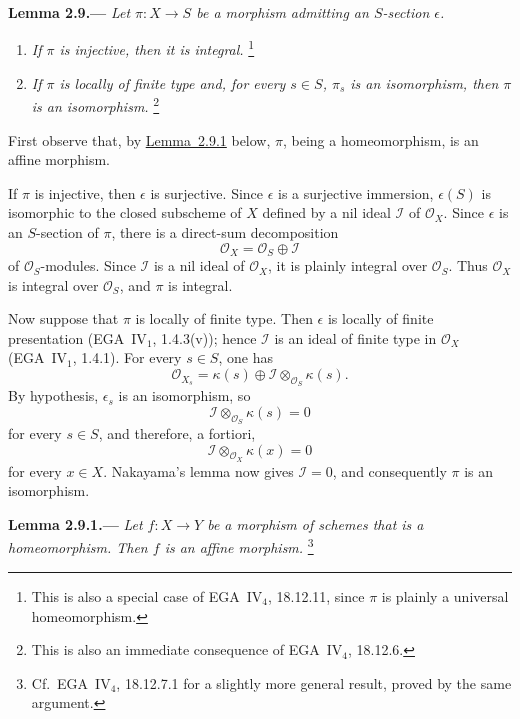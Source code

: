 \medskip
{}\label{lem:sga3-VIB-2.9}%
\noindent\textbf{Lemma 2.9.---}
\emph{Let \(\pi:X\to S\) be a morphism admitting an \(S\)-section
\(\epsilon\).}
\begin{enumerate}
\item[\textup{(i)}] \emph{If \(\pi\) is injective, then it is
  integral.}%
  \begingroup
  \renewcommand{\thefootnote}{\ensuremath{(\ast)}}%
  \footnote[1]{\label{note:sga3-VIB-2.9-star}This is also a
  special case of EGA~IV\(_4\), 18.12.11, since \(\pi\) is
  plainly a universal homeomorphism.}%
  \endgroup
\item[\textup{(ii)}] \emph{If \(\pi\) is locally of finite type
  and, for every \(s\in S\), \(\pi_s\) is an isomorphism, then
  \(\pi\) is an isomorphism.}%
  \begingroup
  \renewcommand{\thefootnote}{\ensuremath{(\ast\ast)}}%
  \footnote[2]{\label{note:sga3-VIB-2.9-starstar}This is also an
  immediate consequence of EGA~IV\(_4\), 18.12.6.}%
  \endgroup
\end{enumerate}

First observe that, by \hyperref[lem:sga3-VIB-2.9.1]{Lemma~2.9.1} below, \(\pi\), being a
homeomorphism, is an affine morphism.

If \(\pi\) is injective, then \(\epsilon\) is surjective. Since
\(\epsilon\) is a surjective immersion, \(\epsilon(S)\) is
isomorphic to the closed subscheme of \(X\) defined by a nil ideal
\(\mathcal I\) of \(\mathcal O_X\). Since \(\epsilon\) is an
\(S\)-section of \(\pi\), there is a direct-sum decomposition
\[
  \mathcal O_X=\mathcal O_S\oplus\mathcal I
\]
of \(\mathcal O_S\)-modules. Since \(\mathcal I\) is a nil ideal
of \(\mathcal O_X\), it is plainly integral over \(\mathcal O_S\).
Thus \(\mathcal O_X\) is integral over \(\mathcal O_S\), and
\(\pi\) is integral.

Now suppose that \(\pi\) is locally of finite type. Then
\(\epsilon\) is locally of finite presentation
(EGA~IV\(_1\), 1.4.3(v)); hence \(\mathcal I\) is an ideal of
finite type in \(\mathcal O_X\) (EGA~IV\(_1\), 1.4.1). For every
\(s\in S\), one has
\[
  \mathcal O_{X_s}
    =\kappa(s)\oplus
      \mathcal I\otimes_{\mathcal O_S}\kappa(s).
\]
By hypothesis, \(\epsilon_s\) is an isomorphism, so
\[
  \mathcal I\otimes_{\mathcal O_S}\kappa(s)=0
\]
for every \(s\in S\), and therefore, a fortiori,
\[
  \mathcal I\otimes_{\mathcal O_X}\kappa(x)=0
\]
for every \(x\in X\). Nakayama's lemma now gives
\(\mathcal I=0\), and consequently \(\pi\) is an isomorphism.

\medskip
{}\label{lem:sga3-VIB-2.9.1}%
\noindent\textbf{Lemma 2.9.1.---}
\emph{Let \(f:X\to Y\) be a morphism of schemes that is a
homeomorphism. Then \(f\) is an affine morphism.}%
\begingroup
\renewcommand{\thefootnote}{\ensuremath{(\ast\ast\ast)}}%
\footnote[3]{\label{note:sga3-VIB-2.9.1-starstarstar}Cf.\
EGA~IV\(_4\), 18.12.7.1 for a slightly more general result, proved
by the same argument.}%
\endgroup

